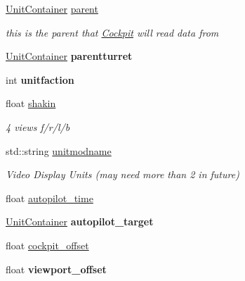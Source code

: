 \begin{DoxyCompactItemize}
\item 
\hyperlink{classUnitContainer}{Unit\+Container} \hyperlink{classCockpit_a5a28bce27feff8d43de419368eb2da1c}{parent}\hypertarget{classCockpit_a5a28bce27feff8d43de419368eb2da1c}{}\label{classCockpit_a5a28bce27feff8d43de419368eb2da1c}

\begin{DoxyCompactList}\small\item\em this is the parent that \hyperlink{classCockpit}{Cockpit} will read data from \end{DoxyCompactList}\item 
\hyperlink{classUnitContainer}{Unit\+Container} {\bfseries parentturret}\hypertarget{classCockpit_af11d4927e2e18404b583e9bd1a99af4f}{}\label{classCockpit_af11d4927e2e18404b583e9bd1a99af4f}

\item 
int {\bfseries unitfaction}\hypertarget{classCockpit_a0bd296375ba8c42a1a69f4ae35d42cfe}{}\label{classCockpit_a0bd296375ba8c42a1a69f4ae35d42cfe}

\item 
float \hyperlink{classCockpit_a87434e008fefecbca3dac9272ba7f25b}{shakin}\hypertarget{classCockpit_a87434e008fefecbca3dac9272ba7f25b}{}\label{classCockpit_a87434e008fefecbca3dac9272ba7f25b}

\begin{DoxyCompactList}\small\item\em 4 views f/r/l/b \end{DoxyCompactList}\item 
std\+::string \hyperlink{classCockpit_ac7211adcabf919204ebf498bb73adbd6}{unitmodname}\hypertarget{classCockpit_ac7211adcabf919204ebf498bb73adbd6}{}\label{classCockpit_ac7211adcabf919204ebf498bb73adbd6}

\begin{DoxyCompactList}\small\item\em Video Display Units (may need more than 2 in future) \end{DoxyCompactList}\item 
float \hyperlink{classCockpit_af9bafcbbecb751c2d3529f2a1f632a69}{autopilot\+\_\+time}
\item 
\hyperlink{classUnitContainer}{Unit\+Container} {\bfseries autopilot\+\_\+target}\hypertarget{classCockpit_ac61f327dd555f422b9aef7200ba9e409}{}\label{classCockpit_ac61f327dd555f422b9aef7200ba9e409}

\item 
float \hyperlink{classCockpit_abfd38e7f629da18799014c03912a8f7d}{cockpit\+\_\+offset}
\item 
float {\bfseries viewport\+\_\+offset}\hypertarget{classCockpit_a528c3dd4a506eabb6fad8df059295cc6}{}\label{classCockpit_a528c3dd4a506eabb6fad8df059295cc6}


\end{DoxyCompactItemize}
